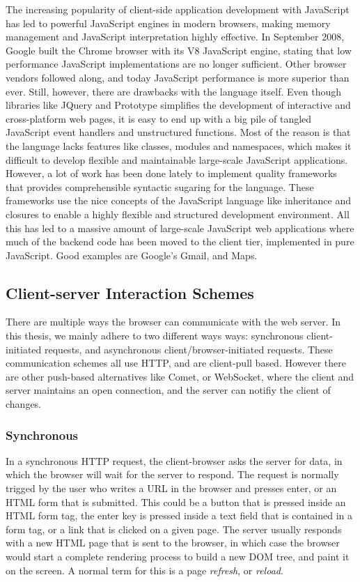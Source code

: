 The increasing popularity of client-side application development with JavaScript has led to powerful JavaScript engines in modern browsers, making memory management and JavaScript interpretation highly effective. In September 2008, Google built the Chrome browser with its V8 JavaScript engine,\cite{v8} stating that low performance JavaScript implementations are no longer sufficient. Other browser vendors followed along, and today JavaScript performance is more superior than ever. Still, however, there are drawbacks with the language itself. Even though libraries like JQuery and Prototype simplifies the development of interactive and cross-platform web pages, it is easy to end up with a big pile of tangled JavaScript event handlers and unstructured functions. Most of the reason is that the language lacks features like classes, modules and namespaces, which makes it difficult to develop flexible and maintainable large-scale JavaScript applications. However, a lot of work has been done lately to implement quality frameworks that provides comprehensible syntactic sugaring for the language. These frameworks use the nice concepts of the JavaScript language like inheritance and closures to enable a highly flexible and structured development environment. All this has led to a massive amount of large-scale JavaScript web applications where much of the backend code has been moved to the client tier, implemented in pure JavaScript. Good examples are Google's Gmail,\cite{mail} and Maps. \cite{maps} 


\subsection{Client-server Interaction Schemes}
There are multiple ways the browser can communicate with the web server. In this thesis, we mainly adhere to two different ways ways: synchronous client-initiated requests, and asynchronous client/browser-initiated requests. These communication schemes all use HTTP, and are client-pull based. However there are other push-based alternatives like Comet,\cite{comet} or WebSocket,\cite{websocket} where the client and server maintains an open connection, and the server can notifiy the client of changes.

\subsubsection{Synchronous}
In a synchronous HTTP request, the client-browser asks the server for data, in which the browser will wait for the server to respond. The request is normally trigged by the user who writes a URL in the browser and presses enter, or an HTML form that is submitted. This could be a button that is pressed inside an HTML form tag, the enter key is pressed inside a text field that is contained in a form tag, or a link that is clicked on a given page. The server usually responds with a new HTML page that is sent to the browser, in which case the browser would start a complete rendering process to build a new DOM tree, and paint it on the screen. A normal term for this is a page \textit{refresh}, or \textit{reload}.

